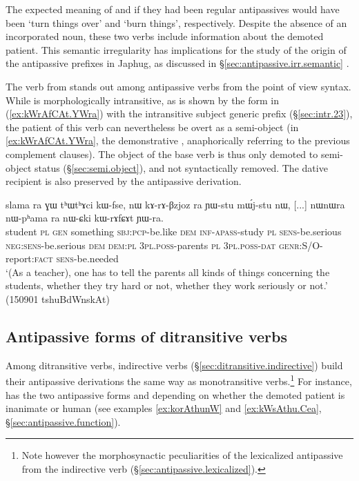 The expected meaning of  and  if they had been regular antipassives would have been `turn things over' and `burn things', respectively. Despite the absence of an incorporated noun, these two verbs include information about the demoted patient. This semantic irregularity has implications for the study of the origin of the antipassive prefixes in Japhug, as discussed in §\ref{sec:antipassive.irr.semantic} .

\largerpage
The verb  from  stands out among antipassive verbs from the point of view syntax. While  is morphologically intransitive, as is shown by the form  in (\ref{ex:kWrAfCAt.YWra}) with the intransitive subject generic prefix  (§\ref{sec:intr.23}), the patient of this verb can nevertheless be overt as a semi-object (in \ref{ex:kWrAfCAt.YWra}, the demonstrative , anaphorically referring to the previous complement clauses). The object of the base verb  is thus only demoted to semi-object status (§\ref{sec:semi.object}), and not syntactically removed. The dative recipient is also preserved by the antipassive derivation.
 

\begin{exe}
\ex \label{ex:kWrAfCAt.YWra}
\gll slama ra ɣɯ tʰɯtʰɤci kɯ-fse, nɯ kɤ-rɤ-βzjoz ra ɲɯ-stu mɯ́j-stu nɯ,
[...] nɯnɯra nɯ-pʰama ra nɯ-ɕki kɯ-rɤfɕɤt ɲɯ-ra. \\
student \textsc{pl} \textsc{gen} something \textsc{sbj}:\textsc{pcp}-be.like \textsc{dem} \textsc{inf}-\textsc{apass}-study \textsc{pl} \textsc{sens}-be.serious \textsc{neg}:\textsc{sens}-be.serious \textsc{dem} {  }  \textsc{dem}:\textsc{pl} \textsc{3pl}.\textsc{poss}-parents \textsc{pl} \textsc{3pl}.\textsc{poss}-\textsc{dat} \textsc{genr}:S/O-report:\textsc{fact} \textsc{sens}-be.needed \\
\glt `(As a teacher), one has to tell the parents all kinds of things concerning the students, whether they try hard or not, whether they work seriously or not.' (150901 tshuBdWnskAt)
\end{exe}

 
\subsection{Antipassive forms of ditransitive verbs } \label{sec:antipassive.ditransitive}
 
Among ditransitive verbs, indirective verbs (§\ref{sec:ditransitive.indirective}) build their antipassive derivations the same way as monotransitive verbs.\footnote{Note however the morphosynactic peculiarities of the lexicalized antipassive    from the indirective verb  (§\ref{sec:antipassive.lexicalized}). } For instance,   has the two antipassive forms  and  depending on whether the demoted patient is inanimate or human (see examples \ref{ex:korAthunW} and \ref{ex:kWsAthu.Cea}, §\ref{sec:antipassive.function}).


